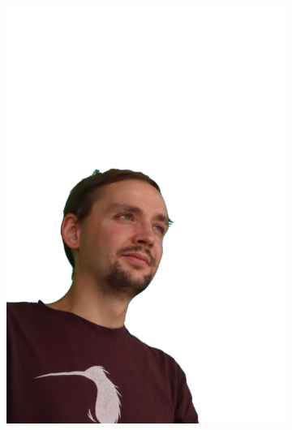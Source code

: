 \begin{figure}[!ht]
\begin{subfigure}{0.12\linewidth}
        \includegraphics[width=\textwidth]{Figures/results/initials/simon/14_render.png}
	\end{subfigure}
    \begin{subfigure}{0.12\linewidth}

\end{subfigure}
\end{figure}
